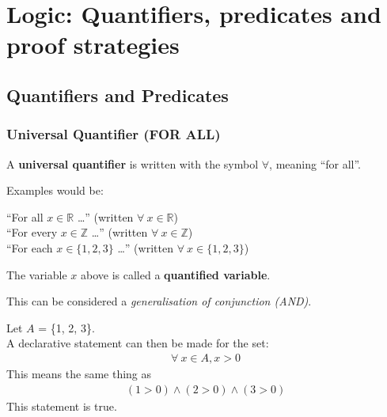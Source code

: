 \documentclass[../notes.tex]{subfiles}
\begin{document}
	\ifSubfilesClassLoaded{\setcounter{chapter}{9}}{}
	\chapter[Logic: Predicates and Proof Strategies]{Logic: Quantifiers, predicates and proof strategies}
		\section{Quantifiers and Predicates}
			\subsection[Universal Quantifier]{Universal Quantifier (FOR ALL)}
				A \textbf{universal quantifier} is written with the symbol $\forall$, meaning ``for all''.
				\begin{example}
					Examples would be:
					\begin{adjustwidth}{1cm}{}
						``For all $x \in \mathbb{R}$ \ldots'' (written $\forall \: x \in \mathbb{R}$)\\
						``For every $x \in \mathbb{Z}$ \ldots'' (written $\forall \: x \in \mathbb{Z}$)\\
						``For each $x \in \{1, 2, 3\}$ \ldots'' (written $\forall \: x \in \{1, 2, 3\}$)
					\end{adjustwidth}
					The variable $x$ above is called a \textbf{quantified variable}.
				\end{example}
				This can be considered a \textit{generalisation of conjunction (AND)}.
				\begin{example}
					Let $A$ = \{1, 2, 3\}.\\
					A declarative statement can then be made for the set:
					\begin{align*}
						\forall \: x \in A, x > 0
					\end{align*}
					This means the same thing as 
					\begin{align*}
						(1 > 0) \land (2 > 0) \land (3 > 0)
					\end{align*}
					This statement is true.
				\end{example}
				\pagebreak
\end{document}

